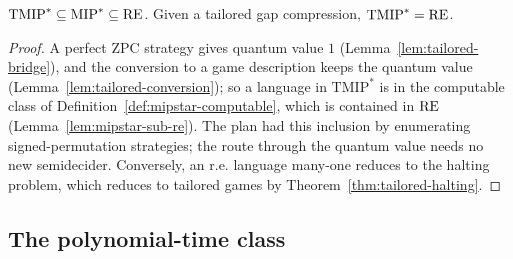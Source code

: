 \begin{theorem}[$\mathrm{TMIP}^* = \RE$, as classes; II:787, II:1838, II:6997]
\label{thm:tmipstar-eq-re}
\leanok
$\mathrm{TMIP}^* \subseteq \mathrm{MIP}^* \subseteq \mathrm{RE}$. Given a tailored gap compression,
$\mathrm{TMIP}^* = \RE$.
\end{theorem}

\begin{proof}
\leanok
A perfect ZPC strategy gives quantum value $1$ (Lemma~\ref{lem:tailored-bridge}), and the
conversion to a game description keeps the quantum value (Lemma~\ref{lem:tailored-conversion});
so a language in $\mathrm{TMIP}^*$ is in the computable class of
Definition~\ref{def:mipstar-computable}, which is contained in $\mathrm{RE}$
(Lemma~\ref{lem:mipstar-sub-re}). The plan had this inclusion by enumerating signed-permutation
strategies; the route through the quantum value needs no new semidecider. Conversely, an r.e.
language many-one reduces to the halting problem, which reduces to tailored games by
Theorem~\ref{thm:tailored-halting}.
\end{proof}

\subsection{The polynomial-time class}

